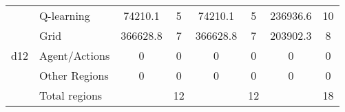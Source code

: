 \begin{tabular}{ c l | cc | cc | cc }
%
%
%
\multirow{5}{*}{d12} & Q-learning 	& 74210.1&5 	&74210.1&5 		&236936.6&10\\
& Grid 					& 366628.8&7 	&366628.8&7 	&203902.3&8 \\
& Agent/Actions 				& 0&0 		&0&0 			&0&0\\
& Other Regions	 			& 0&0 		&0&0 			&0&0\\
& Total regions 				& &12 		&&12 			&&18\\


\end{tabular}
